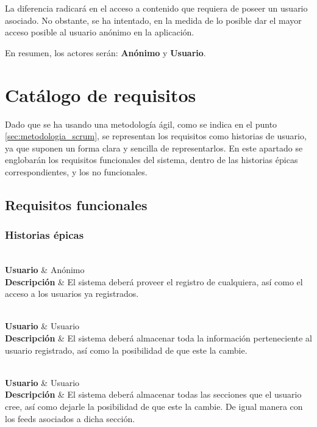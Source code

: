 La diferencia radicará en el acceso a contenido que requiera de poseer un usuario asociado. No obstante, se ha intentado, en la medida de lo posible dar el mayor acceso posible al usuario anónimo en la aplicación.

En resumen, los actores serán: \textbf{Anónimo} y \textbf{Usuario}.

\section{Catálogo de requisitos}\label{sec:catalogo_requisitos}

Dado que se ha usando una metodología ágil, como se indica en el punto \ref{sec:metodologia_scrum}, se representan los requisitos como historias de usuario, ya que suponen un forma clara y sencilla de representarlos. En este apartado se englobarán los requisitos funcionales del sistema, dentro de las historias épicas correspondientes, y los no funcionales.

\subsection{Requisitos funcionales}

\subsubsection{Historias épicas}

{
     \\
    \hline
    \textbf{Usuario} & Anónimo  \\
    \textbf{Descripción} & El sistema deberá proveer el registro de cualquiera, así como el acceso a los usuarios ya registrados.  \\
}

{
     \\
    \hline
    \textbf{Usuario} & Usuario  \\
    \textbf{Descripción} & El sistema deberá almacenar toda la información perteneciente al usuario registrado, así como la posibilidad de que este la cambie. \\
}

{
     \\
    \hline
    \textbf{Usuario} & Usuario  \\
    \textbf{Descripción} & El sistema deberá almacenar todas las secciones que el usuario cree, así como dejarle la posibilidad de que este la cambie. De igual manera con los feeds asociados a dicha sección. \\
}

